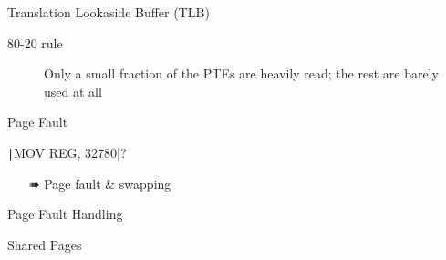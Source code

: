 \begin{frame}{Translation Lookaside Buffer (TLB)}
  \begin{description}
  \item[80-20 rule] Only a small fraction of the PTEs are heavily read; the rest are
    barely used at all
  \end{description}
  \centering
\end{frame}

\begin{frame}[fragile]{Page Fault}
  \begin{minipage}{.44\textwidth}
    \centering
  \end{minipage}\hfill
  \begin{minipage}{.4\textwidth}
    \texttt|MOV REG, 32780|?
    \begin{itemize}
    \item[\symbola ➠] Page fault \& swapping
    \end{itemize}
  \end{minipage}
\end{frame}

\begin{frame}{Page Fault Handling}
  \centering
  \mode<beamer>{ \texttt{[image: osc-9-14]} }%
\end{frame}


\begin{frame}{Shared Pages}
  \centering
  \mode<beamer>{ \texttt{[image: osc-8-33]} }%
\end{frame}

